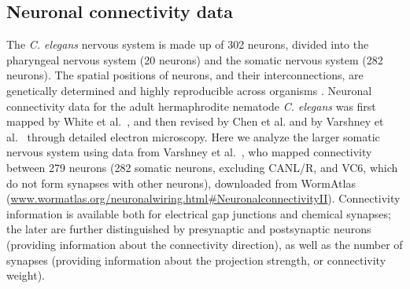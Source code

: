 \documentclass[10pt,letterpaper]{article}
\begin{document}
\subsection*{Neuronal connectivity data}
The \emph{C. elegans} nervous system is made up of 302 neurons, divided into the pharyngeal nervous system (20 neurons) and the somatic nervous system (282 neurons).
The spatial positions of neurons, and their interconnections, are genetically determined and highly reproducible across organisms \cite{Riddle1997}.
Neuronal connectivity data for the adult hermaphrodite nematode \emph{C. elegans} was first mapped by White et al.~\cite{White:1986tx}, and then revised by Chen et al. \cite{Chen:2006ie} and by Varshney et al.~\cite{Varshney2011} through detailed electron microscopy.
Here we analyze the larger somatic nervous system using data from Varshney et al.~\cite{Varshney2011}, who mapped connectivity between 279 neurons (282 somatic neurons, excluding CANL/R, and VC6, which do not form synapses with other neurons), downloaded from WormAtlas (\url{www.wormatlas.org/neuronalwiring.html#NeuronalconnectivityII}).
Connectivity information is available both for electrical gap junctions and chemical synapses; the later are further distinguished by presynaptic and postsynaptic neurons (providing information about the connectivity direction), as well as the number of synapses (providing information about the projection strength, or connectivity weight).
\end{document}

